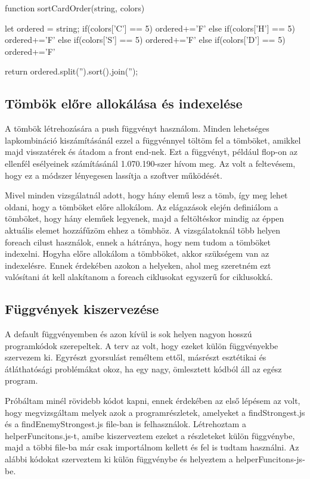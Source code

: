 \begin{python}
function sortCardOrder(string, colors){
    let ordered = string;
    if(colors['C'] == 5){
      ordered+='F'
    } else if(colors['H'] == 5){
      ordered+='F'
    } else if(colors['S'] == 5){
      ordered+='F'
    } else if(colors['D'] == 5){
      ordered+='F'
    }
  
    return ordered.split('').sort().join('');
}
\end{python}

\subsection{Tömbök előre allokálása és indexelése}
A tömbök létrehozására a push függvényt használom. Minden lehetséges lapkombináció kiszámításánál ezzel a függvénnyel töltöm fel a tömböket, amikkel majd visszatérek és átadom a front end-nek. Ezt a függvényt, például flop-on az ellenfél esélyeinek számításánál 1.070.190-szer hívom meg. Az volt a feltevésem, hogy ez a módszer lényegesen lassítja a szoftver működését.

Mivel minden vizsgálatnál adott, hogy hány elemű lesz a tömb, így meg lehet oldani, hogy a tömböket előre allokálom. Az elágazások elején definiálom a tömböket, hogy hány eleműek legyenek, majd a feltöltéskor mindig az éppen aktuális elemet hozzáfűzöm ehhez a tömbhöz. A vizsgálatoknál több helyen foreach cilust használok, ennek a hátránya, hogy nem tudom a tömböket indexelni. Hogyha előre allokálom a tömbböket, akkor szükségem van az indexelésre. Ennek érdekében azokon a helyeken, ahol meg szeretném ezt valósítani át kell alakítanom a foreach ciklusokat egyszerű for ciklusokká.

\subsection{Függvények kiszervezése}
A default függvényemben és azon kívül is sok helyen nagyon hosszú programkódok szerepeltek. A terv az volt, hogy ezeket külön függvényekbe szervezem ki. Egyrészt gyorsulást reméltem ettől, másrészt esztétikai és átláthatósági problémákat okoz, ha egy nagy, ömlesztett kódból áll az egész program.

Próbáltam minél rövidebb kódot kapni, ennek érdekében az első lépésem az volt, hogy megvizsgáltam melyek azok a programrészletek, amelyeket a findStrongest.js és a findEnemyStrongest.js file-ban is felhasználok. Létrehoztam a helperFuncitons.js-t, amibe kiszerveztem ezeket a részleteket külön függvénybe, majd a többi file-ba már csak importálnom kellett és fel is tudtam használni. Az alábbi kódokat szerveztem ki külön függvénybe és helyeztem a helperFuncitons-js-be.

